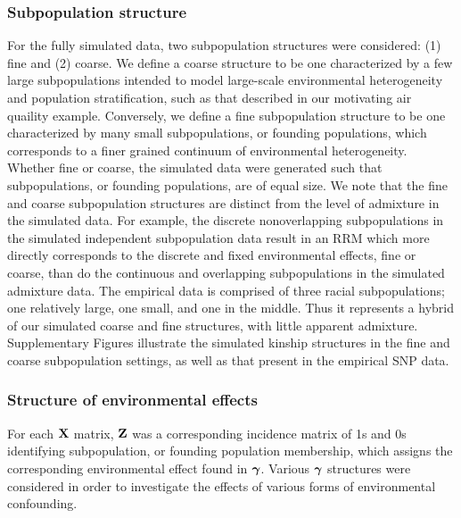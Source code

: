 \subsubsection{Subpopulation structure}
For the fully simulated data, two subpopulation structures were considered: (1) fine and (2) coarse. We define a coarse structure to be one characterized by a few large subpopulations intended to model large-scale environmental heterogeneity and population stratification, such as that described in our motivating air quaility example. Conversely, we define a fine subpopulation structure to be one characterized by many small subpopulations, or founding populations, which corresponds to a finer grained continuum of environmental heterogeneity. Whether fine or coarse, the simulated data were generated such that subpopulations, or founding populations, are of equal size. We note that the fine and coarse subpopulation structures are distinct from the level of admixture in the simulated data. For example, the discrete nonoverlapping subpopulations in the simulated independent subpopulation data result in an RRM which more directly corresponds to the discrete and fixed environmental effects, fine or coarse, than do the continuous and overlapping subpopulations in the simulated admixture data. The empirical data is comprised of three racial subpopulations; one relatively large, one small, and one in the middle. Thus it represents a hybrid of our simulated coarse and fine structures, with little apparent admixture. Supplementary Figures  illustrate the simulated kinship structures in the fine and coarse subpopulation settings, as well as that present in the empirical SNP data. 

\subsubsection{Structure of environmental effects}
For each $\textbf{X}$ matrix, $\textbf{Z}$ was a corresponding incidence matrix of 1s and 0s identifying subpopulation, or founding population membership, which assigns the corresponding environmental effect found in $\boldsymbol{\gamma}$. Various $\boldsymbol{\gamma}$ structures were considered in order to investigate the effects of various forms of environmental confounding. 

